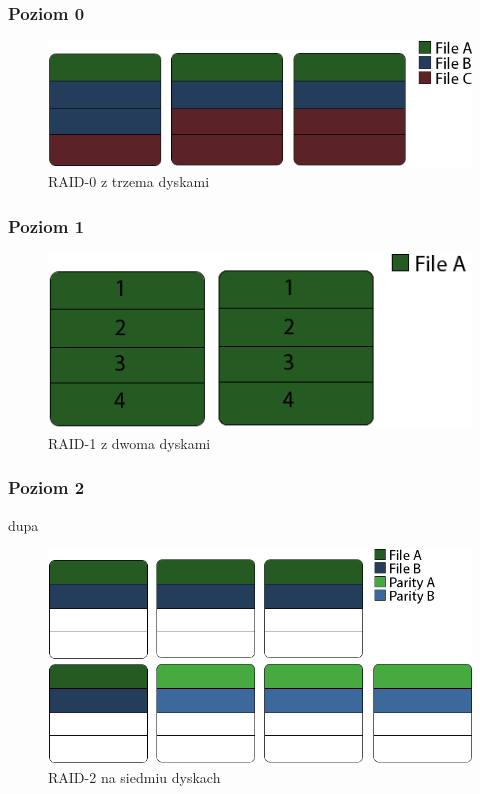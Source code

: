 \subsubsection{Poziom 0}
\begin{figure}[h!]
        \centering
        \includegraphics{raid-0.png}
        \caption{RAID-0 z trzema dyskami}
        \label{fig:raid0}
\end{figure}
\subsubsection{Poziom 1}
\begin{figure}[h!]
        \centering
        \includegraphics{raid-1.png}
        \caption{RAID-1 z dwoma dyskami}
        \label{fig:raid1}
\end{figure}
\subsubsection{Poziom 2}
dupa
\begin{figure}[h!]
        \centering
        \includegraphics{raid-2.png}
        \caption{RAID-2 na siedmiu dyskach}
        \label{fig:raid2}
\end{figure}
